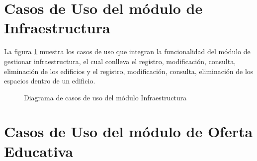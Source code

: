 
\section{Casos de Uso del módulo de Infraestructura}

La figura \ref{fig:casosUso:gestionarInfraestructura} muestra los casos de uso que integran la funcionalidad del módulo de gestionar infraestructura, el cual conlleva el registro, modificación, consulta, eliminación de los edificios y el registro, modificación, consulta, eliminación de los espacios dentro de un edificio.
\begin{figure}[htpb!]
	\begin{center}
		\caption{Diagrama de casos de uso del módulo Infraestructura \label{fig:casosUso:gestionarInfraestructura}}
	\end{center}
\end{figure}


\section{Casos de Uso del módulo de Oferta Educativa}

